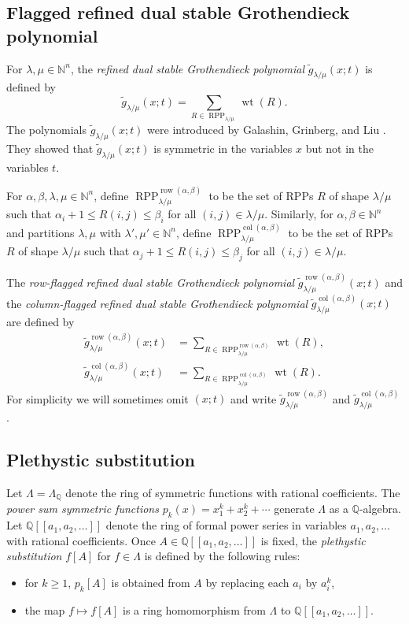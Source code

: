 \documentclass[12pt]{amsart}
\numberwithin{equation}{section}
\theoremstyle{definition}
\newcommand\wg{\widetilde{g}}
\newcommand\col{\operatorname{col}}
\newcommand\row{\operatorname{row}}
\newcommand\NN{\mathbb{N}}
\newcommand\RPP{\operatorname{RPP}}
\newcommand\lm{{\lambda/\mu}}
\newcommand\wt{\operatorname{wt}}
\begin{document}
\subsection{Flagged refined dual stable Grothendieck polynomial}


For $\lambda,\mu\in\NN^n$, the \emph{refined dual stable Grothendieck
  polynomial} $\wg_{\lambda/\mu}(x;t)$ is defined by
\[
  \wg_{\lambda/\mu}(x;t) =
\sum_{R\in \RPP_{\lambda/\mu}} \wt(R).
\]
The polynomials $\wg_\lm(x;t)$ were introduced by Galashin, Grinberg, and Liu
\cite{GGL2016}. They showed that $\wg_\lm(x;t)$ is symmetric in the variables
$x$ but not in the variables $t$. 



For $\alpha,\beta,\lambda,\mu\in\NN^n$, define
$\RPP_{\lambda/\mu}^{\row(\alpha,\beta)}$ to be the set of RPPs $R$ of shape
$\lm$ such that $\alpha_i+1\le R(i,j)\le \beta_i$ for all $(i,j)\in\lm$.
Similarly, for $\alpha,\beta\in\NN^n$ and partitions $\lambda,\mu$ with
$\lambda',\mu'\in\NN^n$, define $\RPP_{\lambda/\mu}^{\col(\alpha,\beta)}$ to be
the set of RPPs $R$ of shape $\lm$ such that $\alpha_j+1\le R(i,j)\le \beta_j$
for all $(i,j)\in\lm$.

The \emph{row-flagged refined dual stable Grothendieck polynomial}
$\wg_{\lambda/\mu}^{\row(\alpha,\beta)}(x;t)$ and the \emph{column-flagged refined
  dual stable Grothendieck polynomial}
$\wg_{\lambda/\mu}^{\col(\alpha,\beta)}(x;t)$ are defined by
\begin{align*}
  \wg_{\lambda/\mu}^{\row(\alpha,\beta)}(x;t) &=
\sum_{R\in \RPP_{\lambda/\mu}^{\row(\alpha,\beta)}} \wt(R),\\
  \wg_{\lambda/\mu}^{\col(\alpha,\beta)}(x;t) &=
\sum_{R\in \RPP_{\lambda/\mu}^{\col(\alpha,\beta)}} \wt(R).
\end{align*}
For simplicity we will sometimes omit $(x;t)$ and write
$\wg_{\lambda/\mu}^{\row(\alpha,\beta)}$ and
$\wg_{\lambda/\mu}^{\col(\alpha,\beta)}$.


\subsection{Plethystic substitution}
\label{sec:plethysm}


Let $\Lambda=\Lambda_{\mathbb{Q}}$ denote the ring of symmetric functions with
rational coefficients. The \emph{power sum symmetric functions}
$p_k(x)=x_1^k+x_2^k+\cdots$ generate $\Lambda$ as a $\mathbb{Q}$-algebra. Let
$\mathbb{Q}[[a_1,a_2,\dots]]$ denote the ring of formal power series in
variables $a_1,a_2,\dots$ with rational coefficients. Once
$A\in\mathbb{Q}[[a_1,a_2,\dots]]$ is fixed, the \emph{plethystic substitution}
$f[A]$ for $f\in\Lambda$ is defined by the following rules:
\begin{itemize}
\item for $k\ge1$, $p_k[A]$ is obtained from $A$ by replacing each $a_i$ by
  $a_i^k$,
\item the map $f\mapsto f[A]$ is a ring homomorphism from $\Lambda$ to
  $\mathbb{Q}[[a_1,a_2,\dots]]$.
\end{itemize}
\end{document}
